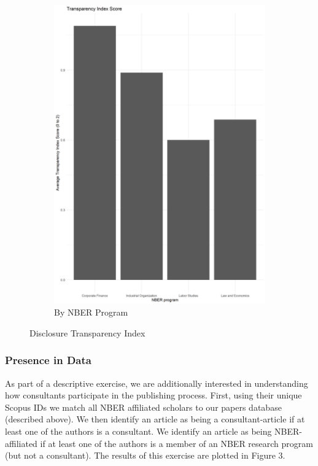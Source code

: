 \documentclass[11pt, letterpaper, twoside]{article}
\begin{document}
\begin{figure}[h]
\begin{subfigure}[h]{0.45\textwidth}
        \includegraphics[width=\textwidth]{figures/transparencyByProgram.png}
        \caption{By NBER Program}
    \end{subfigure}
    \caption{Disclosure Transparency Index}
\end{figure}



\subsubsection{Presence in Data}
As part of a descriptive exercise, we are additionally interested in understanding how consultants participate in the publishing process. First, using their unique Scopus IDs we match all NBER affiliated scholars to our papers database (described above). We then identify an article as being a consultant-article if at least one of the authors is a consultant. We identify an article as being NBER-affiliated if at least one of the authors is a member of an NBER research program (but not a consultant). The results of this exercise are plotted in Figure 3.\\
\end{document}
